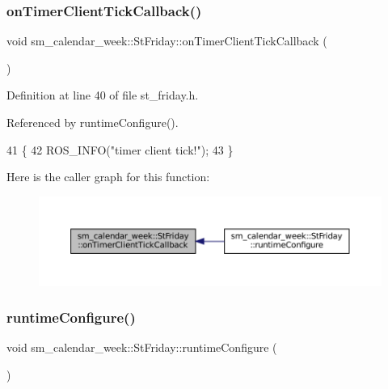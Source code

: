 \subsubsection{\texorpdfstring{on\+Timer\+Client\+Tick\+Callback()}{onTimerClientTickCallback()}}
{\footnotesize\ttfamily void sm\+\_\+calendar\+\_\+week\+::\+St\+Friday\+::on\+Timer\+Client\+Tick\+Callback (\begin{DoxyParamCaption}{ }\end{DoxyParamCaption})\hspace{0.3cm}{\ttfamily [inline]}}



Definition at line 40 of file st\+\_\+friday.\+h.



Referenced by runtime\+Configure().


\begin{DoxyCode}
41     \{
42         ROS\_INFO(\textcolor{stringliteral}{"timer client tick!"});
43     \}
\end{DoxyCode}
Here is the caller graph for this function\+:
\nopagebreak
\begin{figure}[H]
\begin{center}
\leavevmode
\includegraphics[width=350pt]{structsm__calendar__week_1_1StFriday_a79317a2a67708590e046d49627a30a55_icgraph}
\end{center}
\end{figure}
\mbox{\label{structsm__calendar__week_1_1StFriday_a5fce56702b4d55872f82dc77194e9067}} 
\subsubsection{\texorpdfstring{runtime\+Configure()}{runtimeConfigure()}}
{\footnotesize\ttfamily void sm\+\_\+calendar\+\_\+week\+::\+St\+Friday\+::runtime\+Configure (\begin{DoxyParamCaption}{ }\end{DoxyParamCaption})\hspace{0.3cm}{\ttfamily [inline]}}



